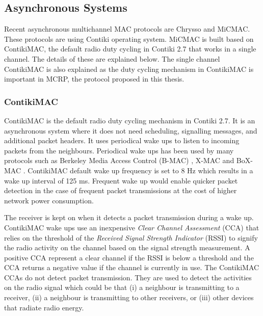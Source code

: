 

\subsection{Asynchronous Systems}
Recent asynchronous multichannel MAC protocols are Chrysso and MiCMAC. These protocols are using Contiki operating system. MiCMAC is built based on ContikiMAC, the default radio duty cycling in Contiki 2.7 that works in a single channel. The details of these are explained below. The single channel ContikiMAC is also explained as the duty cycling mechanism in ContikiMAC is important in MCRP, the protocol proposed in this thesis.

\subsubsection{ContikiMAC}
ContikiMAC \cite{contikimac} is the default radio duty cycling mechanism in Contiki 2.7. It is an asynchronous system where it does not need scheduling, signalling messages, and additional packet headers. It uses periodical wake ups to listen to incoming packets from the neighbours. Periodical wake ups has been used by many protocols such as Berkeley Media Access Control (B-MAC) \cite{bmac}, X-MAC \cite{xmac} and BoX-MAC \cite{boxmac}. 
ContikiMAC default wake up frequency is set to 8 Hz which results in a wake up interval of 125 ms. Frequent wake up would enable quicker packet detection in the case of frequent packet transmissions at the cost of higher network power consumption.

The receiver is kept on when it detects a packet transmission during a wake up. ContikiMAC wake ups use an inexpensive \textit{Clear Channel Assessment} (CCA) that relies on the threshold of the \textit{Received Signal Strength Indicator} (RSSI) to signify the radio activity on the channel based on the signal strength measurement. A positive CCA represent a clear channel if the RSSI is below a threshold and the CCA returns a negative value if the channel is currently in use. The ContikiMAC CCAs do not detect packet transmission. They are used to detect the activities on the radio signal which could be that (i) a neighbour is transmitting to a receiver, (ii) a neighbour is transmitting to other receivers, or (iii) other devices that radiate radio energy. 

